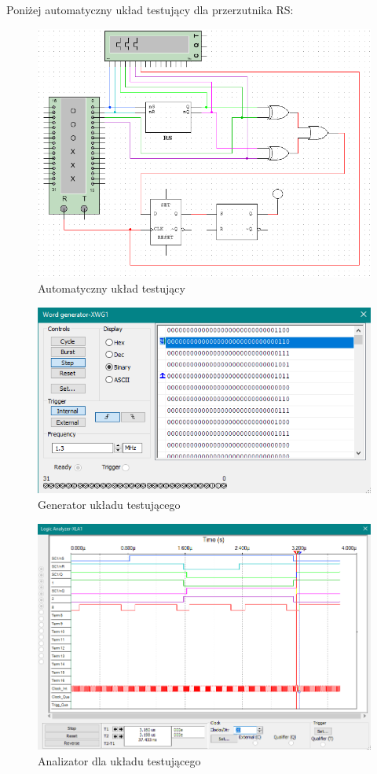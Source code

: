 \documentclass{article}
\begin{document}
Poniżej automatyczny układ testujący dla przerzutnika RS:

\begin{figure}[H]
    \centering
    \includegraphics[width=\textwidth]{tester_1.png}
    \caption{Automatyczny układ testujący}
\end{figure}

\begin{figure}[H]
    \centering
    \includegraphics[width=\textwidth]{test_gen_1.png}
    \caption{Generator układu testującego}
\end{figure}

\begin{figure}[H]
    \centering
    \includegraphics[width=\textwidth]{test_an_1.png}
    \caption{Analizator dla układu testującego}
\end{figure}
\end{document}
